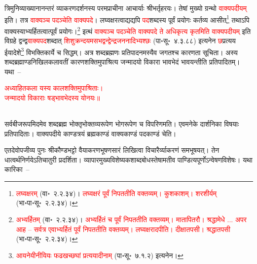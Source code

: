 \begin{sloppypar}\justifying\noindent\hspace{10mm} त्रिमुनि\-व्याख्यानानन्तरं व्याकरण\-दर्शनस्य परम\-प्राचीना आचार्याः श्रीभर्तृहरयः। तेषां मुख्यो ग्रन्थो \textcolor{red}{वाक्यपदीयम्} इति। तत्र \textcolor{red}{वाक्यञ्च पदञ्चेति वाक्यपदे}। लघ्वक्षरत्वाद्यद्यपि \textcolor{red}{पद}\-शब्दस्य पूर्वं प्रयोगः कर्तव्य आसीत्\footnote{\textcolor{red}{लघ्वक्षरम्} (वा॰~२.२.३४)। \textcolor{red}{लघ्वक्षरं पूर्वं निपततीति वक्तव्यम्। कुशकाशम्। शरशीर्यम्} (भा॰पा॰सू॰~२.२.३४)।} तथाऽपि वाक्यस्याभ्यर्हितत्वात्पूर्वं प्रयोगः।\footnote{\textcolor{red}{अभ्यर्हितम्} (वा॰~२.२.३४)। \textcolor{red}{अभ्यर्हितं च पूर्वं निपततीति वक्तव्यम्। मातापितरौ। श्रद्धामेधे ... अपर आह – सर्वत्र एवाभ्यर्हितं पूर्वं निपततीति वक्तव्यम्। लघ्वक्षरादपीति। दीक्षातपसी। श्रद्धातपसी} (भा॰पा॰सू॰~२.२.३४)।} इत्थं \textcolor{red}{वाक्यञ्च पदञ्चेति वाक्य\-पदे ते अधिकृत्य कृतमिति वाक्यपदीयम्} इति विग्रहे द्वन्द्व\-\textcolor{red}{वाक्यपद}\-शब्दात् \textcolor{red}{शिशु\-क्रन्द\-यम\-सभ\-द्वन्द्वेन्द्र\-जननादिभ्यश्छः} (पा॰सू॰~४.३.८८) इत्यनेन \textcolor{red}{छ}\-प्रत्यय ईयादेशे\footnote{\textcolor{red}{आयनेयीनीयियः फढखच्छघां प्रत्ययादीनाम्‌} (पा॰सू॰~७.१.२) इत्यनेन।} विभक्तिकार्ये च सिद्धम्। अत्र शब्द\-ब्रह्मणः प्रतिपादनमस्यैव जगतश्च कारणता सूचिता। अस्य शब्द\-ब्रह्माण्ड\-निखिल\-कलावतीं कारण\-शक्तिमुपाश्रित्य जन्मादयो विकारा भाव\-भेदं भावयन्तीति प्रतिपादितम्। यथा~–\end{sloppypar}
\centering\textcolor{red}{अध्याहितकला यस्य कालशक्तिमुपाश्रिताः।\nopagebreak\\
जन्मादयो विकाराः षड्भावभेदस्य योनयः॥}\nopagebreak\\
\\
\begin{sloppypar}\justifying\noindent\hspace{10mm} सर्व\-बीज\-रूपमिदमेव शब्द\-ब्रह्म भोक्तृ\-भोक्तव्य\-रूपेण भोग\-रूपेण च विपरिणमति। एवमनेके दार्शनिका विषयाः प्रतिपादिताः। वाक्यपदीये काण्ड\-त्रयं ब्रह्म\-काण्डं वाक्य\-काण्डं पद\-काण्डं चेति।\end{sloppypar}
\begin{sloppypar}\justifying\noindent\hspace{10mm} एतदेवोपजीव्य पुनः श्रीकौण्डभट्टो वैयाकरण\-भूषणसारं लिखित्वा विचारैर्व्याकरणं समभूषयत्। तेन धात्वर्थ\-निर्णयेऽति\-चातुरी प्रदर्शिता। व्यापार\-मुख्य\-विशेष्यक\-शाब्दबोधस्तेषामतीव पाण्डित्य\-पूर्णोऽन्वेषण\-विशेषः। यथा कारिका~–\end{sloppypar}
